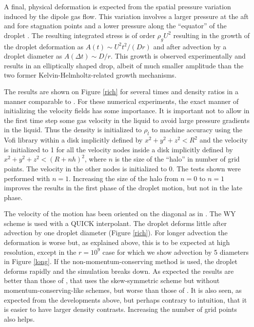 A final, physical deformation is expected from the spatial pressure variation 
induced by the dipole gas flow. This variation involves a larger pressure at 
the aft and fore stagnation points and a lower pressure along the ``equator'' 
of the droplet \cite{Clift78}. The resulting integrated stress is of order 
$\rho_g U^2$ resulting in the growth of the droplet deformation as 
$A(t) \sim U^2 t^2 / (D r)$ and after advection by a droplet diameter as
$A(\Delta t) \sim D / r$. 
This growth is observed experimentally \cite{opfer14} and results in an 
elliptically shaped drop, albeit of much smaller amplitude than the two former 
Kelvin-Helmholtz-related growth mechanisms. 

The results are shown on Figure \ref{rich} for several times and
density ratios in a manner comparable to \cite{bussmann2002modeling}. For these
numerical experiments, the exact manner of initializing the velocity fields has 
some importance. It is important not to allow in the first time step some gas 
velocity in the liquid to avoid large pressure gradients in the liquid. 
Thus the density is initialized to $\rho_l$ to machine accuracy using the 
{\sc Vofi} library \cite{bna2015numerical,bna2016vofi}
within a disk implicitly defined by $x^2 + y^2 + z^2 < R^2$ 
and the velocity is initialized to 1 for all the velocity nodes inside
a disk implicitly defined  by  $x^2 + y^2 + z^2 < (R+nh)^2$, where $n$ is the 
size of the ``halo'' in number of grid points. The velocity in the other
nodes is initialized to 0. The tests shown were performed with $n=1$. 
Increasing the size of the halo from $n=0$ to $n=1$ improves the results in the 
first phase of the droplet motion, but not in the late phase. 

The velocity of the motion has been oriented on the diagonal as in 
\cite{bussmann2002modeling}. The WY scheme is used with a QUICK
interpolant. The droplet deforms little after advection by one droplet 
diameter (Figure \ref{rich}). For longer advection the deformation is worse 
but, as explained above, this is to be expected
at high resolution, except in the $r=10^9$ case for which we show advection 
by 5 diameters in Figure \ref{long}. 
If the non-momentum-conserving method is used, the
droplet deforms rapidly and the simulation breaks down. As expected
the results are better than those of \cite{Fuster2013energy}, that uses the
skew-symmetric scheme but without momentum-conserving-like schemes, 
but worse than those of \cite{bussmann2002modeling,desjardins10,raessi12,le13}. 
It is also seen, as expected from the developments above, 
but perhaps contrary to intuition, that it is easier
to have larger density contrasts. Increasing the number of grid points also helps.


